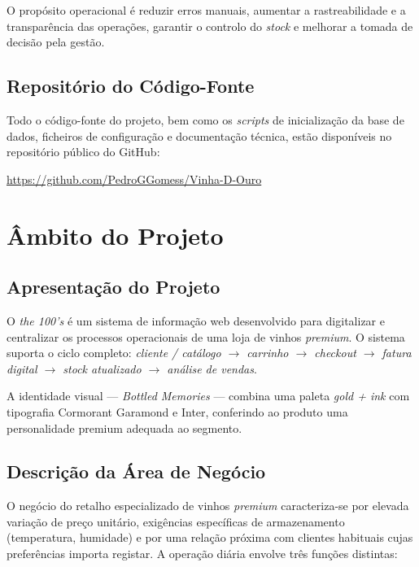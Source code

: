 \documentclass[11pt,a4paper]{report}
\begin{document}
O propósito operacional é reduzir erros manuais, aumentar a rastreabilidade e a transparência das operações, garantir o controlo do \textit{stock} e melhorar a tomada de decisão pela gestão.

\section{Repositório do Código-Fonte}
Todo o código-fonte do projeto, bem como os \textit{scripts} de inicialização da base de dados, ficheiros de configuração e documentação técnica, estão disponíveis no repositório público do GitHub:

\begin{infobox}[GitHub]
\href{https://github.com/PedroGGomess/Vinha-D-Ouro}{https://github.com/PedroGGomess/Vinha-D-Ouro}
\end{infobox}

\chapter{Âmbito do Projeto}\label{cap:ambito}

\section{Apresentação do Projeto}
O \textit{the 100's} é um sistema de informação web desenvolvido para digitalizar e centralizar os processos operacionais de uma loja de vinhos \textit{premium}. O sistema suporta o ciclo completo: \textit{cliente / catálogo $\to$ carrinho $\to$ checkout $\to$ fatura digital $\to$ \textit{stock} atualizado $\to$ análise de vendas}.

A identidade visual --- \textit{Bottled Memories} --- combina uma paleta \textit{gold + ink} com tipografia Cormorant Garamond e Inter, conferindo ao produto uma personalidade premium adequada ao segmento.

\section{Descrição da Área de Negócio}
O negócio do retalho especializado de vinhos \textit{premium} caracteriza-se por elevada variação de preço unitário, exigências específicas de armazenamento (temperatura, humidade) e por uma relação próxima com clientes habituais cujas preferências importa registar. A operação diária envolve três funções distintas:
\end{document}
